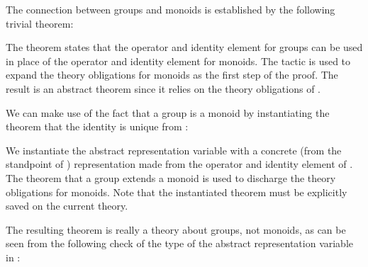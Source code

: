 The connection between groups and monoids is established by the following
trivial theorem:
\begin{boxed}\begin{hol}\begin{alltt}
\end{alltt}\end{hol}\end{boxed}
The theorem states that the operator and identity element for groups can be
used in place of the operator and identity element for monoids.  The tactic
{} is used to expand the theory obligations for
monoids as the first step of the proof.  The result is an abstract theorem
since it relies on the theory obligations of .

We can make use of the fact that a group is a monoid by instantiating the
theorem that the identity is unique from :
\begin{boxed}\begin{hol}\begin{alltt}
\end{alltt}\end{hol}\end{boxed}
We instantiate the abstract representation variable  with a
concrete (from the standpoint of ) representation made from
the operator and identity element of .  The theorem that a
group extends a monoid is used to discharge the theory obligations for
monoids.  Note that the instantiated theorem must be explicitly saved on
the current theory.

The resulting theorem is really a theory about groups, not monoids, as can
be seen from the following check of the type of the abstract representation
variable  in :
\begin{boxed}\begin{hol}\begin{alltt}\end{alltt}\end{hol}\end{boxed}

